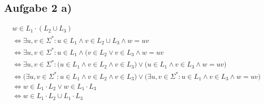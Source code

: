 \documentclass[12pt,a4paper]{article}
\begin{document}
\subsection*{Aufgabe 2 a)}
\begin{align*}
&w\in L_1\cdot(L_2\cup L_3)\\
&\Longleftrightarrow\exists u,v\in\Sigma^\ast:u\in L_1\wedge v\in L_2\cup L_3\wedge w=uv\\
&\Longleftrightarrow\exists u,v\in\Sigma^\ast:u\in L_1\wedge \big(v\in L_2\vee v\in L_3\wedge w=uv\\
&\Longleftrightarrow\exists u,v\in\Sigma^\ast:\big(u\in L_1\wedge v\in L_2\wedge v\in L_3\big)\vee\big(u\in L_1\wedge v\in L_3\wedge w=uv\big)\\
&\Longleftrightarrow\Big(\exists u,v\in\Sigma^\ast:u\in L_1\wedge v\in L_2\wedge v\in L_3\Big)\vee
\Big(\exists u,v\in\Sigma^\ast:u\in L_1\wedge v\in L_3\wedge w=uv\Big)\\
&\Longleftrightarrow w\in L_1\cdot L_2\vee w\in L_1\cdot L_3\\
&\Longleftrightarrow w\in L_1\cdot L_2\cup L_1\cdot L_3
\end{align*}
\end{document}
